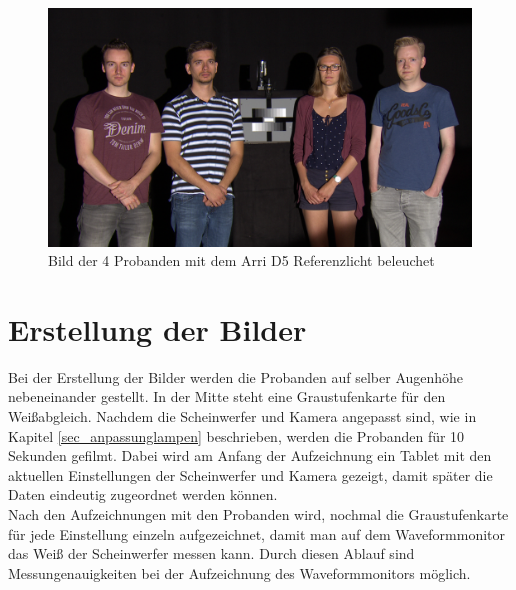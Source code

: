 \begin{figure}[H]     %
\centering
\includegraphics[width=1.0\textwidth]{bilder/umfrage1} 
\caption {Bild der 4 Probanden mit dem Arri D5 Referenzlicht beleuchet}\label{b_umfrage1}
\end{figure}

 
\section{Erstellung der Bilder}
\label{sec_erstellungbilder}
Bei der Erstellung der Bilder werden die Probanden auf selber Augenhöhe nebeneinander gestellt. In der Mitte steht eine Graustufenkarte für den Weißabgleich. Nachdem die Scheinwerfer und Kamera angepasst sind, wie in Kapitel \ref{sec_anpassunglampen} beschrieben, werden die Probanden für 10 Sekunden gefilmt. Dabei wird am Anfang der Aufzeichnung ein Tablet mit den aktuellen Einstellungen der Scheinwerfer und Kamera gezeigt, damit später die Daten eindeutig zugeordnet werden können.\\
Nach den Aufzeichnungen mit den Probanden wird, nochmal die Graustufenkarte für jede Einstellung einzeln aufgezeichnet, damit man auf dem Waveformmonitor das Weiß der Scheinwerfer messen kann. Durch diesen Ablauf sind Messungenauigkeiten bei der Aufzeichnung des Waveformmonitors möglich. 

